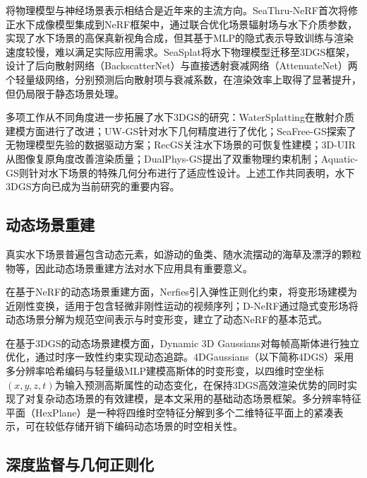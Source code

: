 将物理模型与神经场景表示相结合是近年来的主流方向。SeaThru-NeRF首次将修正水下成像模型集成到NeRF框架中，通过联合优化场景辐射场与水下介质参数，实现了水下场景的高保真新视角合成，但其基于MLP的隐式表示导致训练与渲染速度较慢，难以满足实际应用需求。SeaSplat将水下物理模型迁移至3DGS框架，设计了后向散射网络（BackscatterNet）与直接透射衰减网络（AttenuateNet）两个轻量级网络，分别预测后向散射项与衰减系数，在渲染效率上取得了显著提升，但仍局限于静态场景处理。

多项工作从不同角度进一步拓展了水下3DGS的研究：WaterSplatting在散射介质建模方面进行了改进；UW-GS针对水下几何精度进行了优化；SeaFree-GS探索了无物理模型先验的数据驱动方案；RecGS关注水下场景的可恢复性建模；3D-UIR从图像复原角度改善渲染质量；DualPhys-GS提出了双重物理约束机制；Aquatic-GS则针对水下场景的特殊几何分布进行了适应性设计。上述工作共同表明，水下3DGS方向已成为当前研究的重要内容。

\subsection{动态场景重建}

真实水下场景普遍包含动态元素，如游动的鱼类、随水流摆动的海草及漂浮的颗粒物等，因此动态场景重建方法对水下应用具有重要意义。

在基于NeRF的动态场景重建方面，Nerfies引入弹性正则化约束，将变形场建模为近刚性变换，适用于包含轻微非刚性运动的视频序列；D-NeRF通过隐式变形场将动态场景分解为规范空间表示与时变形变，建立了动态NeRF的基本范式。

在基于3DGS的动态场景建模方面，Dynamic 3D Gaussians对每帧高斯体进行独立优化，通过时序一致性约束实现动态追踪。4DGaussians（以下简称4DGS）采用多分辨率哈希编码与轻量级MLP建模高斯体的时变形变，以四维时空坐标$(x, y, z, t)$为输入预测高斯属性的动态变化，在保持3DGS高效渲染优势的同时实现了对复杂动态场景的有效建模，是本文采用的基础动态场景框架。多分辨率特征平面（HexPlane）是一种将四维时空特征分解到多个二维特征平面上的紧凑表示，可在较低存储开销下编码动态场景的时空相关性。

\subsection{深度监督与几何正则化}


